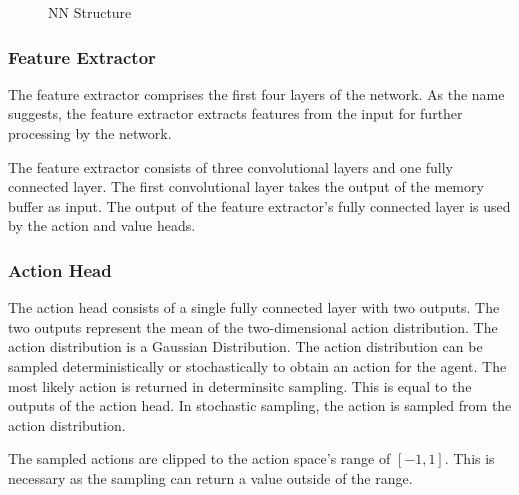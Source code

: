 \begin{figure}[!h]
    \caption{\ac{NN} Structure}
    \label{fig:network_structure}
\end{figure}

\subsubsection{Feature Extractor}

The feature extractor comprises the first four layers of the network. As the name suggests, the feature extractor extracts features from the input for further processing by the network.

The feature extractor consists of three convolutional layers and one fully connected layer. The first convolutional layer takes the output of the memory buffer as input. The output of the feature extractor's fully connected layer is used by the action and value heads.


\subsubsection{Action Head}
\label{sec:action_sampling}

The action head consists of a single fully connected layer with two outputs. The two outputs represent the mean of the two-dimensional action distribution. The action distribution is a Gaussian Distribution. The action distribution can be sampled deterministically or stochastically to obtain an action for the agent. The most likely action is returned in determinsitc sampling. This is equal to the outputs of the action head. In stochastic sampling, the action is sampled from the action distribution.

The sampled actions are clipped to the action space's range of $[-1,1]$. This is necessary as the sampling can return a value outside of the range.


